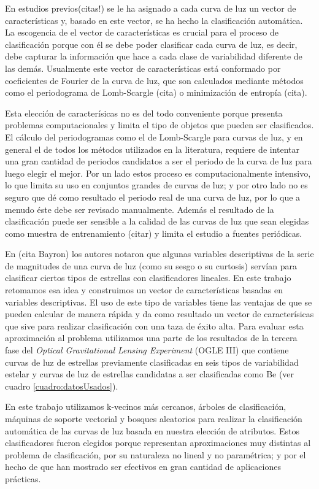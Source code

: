 \documentclass[letterpaper,12pt]{book}
\begin{document}
En estudios previos(citas!) se le ha asignado a cada curva de luz un vector de características y, basado en este vector, se ha hecho la clasificación automática. La escogencia de el vector de características es crucial para el proceso de clasificación porque con él se debe poder clasificar cada curva de luz, es decir, debe capturar la información que hace a cada clase de variabilidad diferente de las demás. Usualmente este vector de características está conformado por coeficientes de Fourier de la curva de luz, que son calculados mediante métodos como el periodograma de  Lomb-Scargle (cita) o minimización de entropía (cita). 

Esta elección de caracterísicas no es del todo conveniente porque presenta problemas computacionales y limita el tipo de objetos que pueden ser clasificados. El cálculo del periodogramas como el de Lomb-Scargle para curvas de luz, y en general el de todos los métodos utilizados en la literatura, requiere de intentar una gran cantidad de periodos candidatos a ser el periodo de la curva de luz para luego elegir el mejor. Por un lado estos proceso es computacionalmente intensivo, lo que limita su uso en conjuntos grandes de curvas de luz; y por otro lado no es seguro que dé como resultado el periodo real de una curva de luz, por lo que a menudo éste debe ser revisado manualmente. Además el resultado de la clasificación puede ser sensible a la calidad de las curvas de luz que sean elegidas como muestra de entrenamiento (citar) y limita el estudio a fuentes periódicas.  

En (cita Bayron) los autores notaron que algunas variables descriptivas de la serie de magnitudes de una curva de luz (como su sesgo o su curtosis) servían para clasificar ciertos tipos de estrellas con clasificadores lineales. En este trabajo retomamos esa idea y construimos un vector de características basadas en variables descriptivas. El uso de este tipo de variables tiene las ventajas de que se pueden calcular de manera rápida y da como resultado un vector de caracterísicas que sive para realizar clasificación con una taza de éxito alta. Para evaluar esta aproximación al problema utilizamos una parte de los resultados de la tercera fase del \textit{Optical Gravitational Lensing Experiment} (OGLE III) que contiene curvas de luz  de estrellas previamente clasificadas en seis tipos de variabilidad estelar y curvas de luz de estrellas candidatas a ser clasificadas como Be (ver cuadro \ref{cuadro:datosUsados}).


En este trabajo utilizamos k-vecinos más cercanos, árboles de clasificación, máquinas de soporte vectorial y bosques aleatorios para realizar la clasificación automática de las curvas de luz basada en nuestra elección de atributos. Estos clasificadores fueron elegidos porque representan aproximaciones muy distintas al problema de clasificación, por su naturaleza no lineal y no paramétrica; y por el hecho de que han mostrado ser efectivos en gran cantidad de aplicaciones prácticas. 
\end{document}
